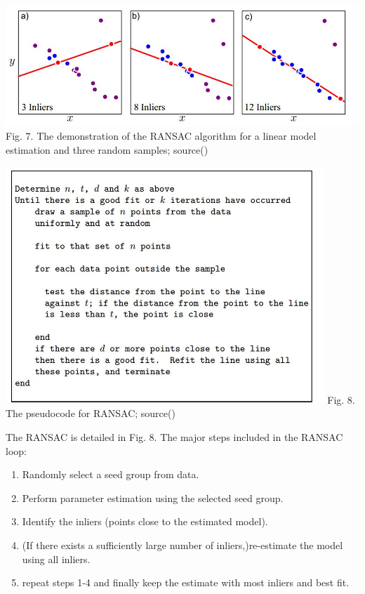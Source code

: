 \documentclass{article}
\begin{document}
\includegraphics[width=\textwidth]{ransac2.jpg}
Fig. 7. The demonstration of the RANSAC algorithm for a linear model estimation and three random samples; source(\cite{prince2012computer})


\includegraphics[width=0.9\textwidth]{ransac3.jpg}
Fig. 8. The pseudocode for RANSAC; source(\cite{forsyth2011computer})

The RANSAC is detailed in Fig. 8. The major steps included in the RANSAC loop:

\begin{enumerate}
  \item Randomly select a seed group from data.
  \item Perform parameter estimation using the selected seed group.
  \item Identify the inliers (points close to the estimated model).
  \item (If there exists a sufficiently large number of inliers,)re-estimate the model using all inliers.
  \item repeat steps 1-4 and finally keep the estimate with most inliers and best fit.
\end{enumerate}
\end{document}
